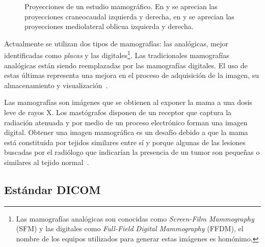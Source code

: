 \begin{figure}[h]
    \centering

    \hspace{1cm}

    \bigskip

    \hspace{1cm}

  \caption[Proyecciones de un estudio mamográfico]{Proyecciones de un estudio
  mamográfico. En \protect{} y \protect{} se aprecian las
  proyecciones craneocaudal izquierda y derecha, en \protect{} y
  \protect{} se aprecian las proyecciones mediolateral oblicua
  izquierda y derecha.}

  \label{fig:views}
\end{figure}

Actualmente se utilizan dos tipos de mamografías: las analógicas, mejor
identificadas como \textit{placas} y las digitales\footnote{Las mamografías
analógicas son conocidas como \textit{Screen-Film Mammography} (SFM) y las
digitales como \textit{Full-Field Digital Mammography} (FFDM), el nombre de los
equipos utilizados para generar estas imágenes es homónimo.}. Las tradicionales
mamografías analógicas están siendo reemplazadas por las mamografías digitales.
El uso de estas últimas representa una mejora en el proceso de adquisición de
la imagen, su almacenamiento y visualización~\cite{pisano2000current}.

Las mamografías son imágenes que se obtienen al exponer la mama a una dosis
leve de rayos X. Los mastógrafos disponen de un receptor que captura la
radiación atenuada y por medio de un proceso electrónico forman una imagen
digital. Obtener una imagen mamográfica es un desafío debido a que la mama está
constituida por tejidos similares entre sí y porque algunas de las lesiones
buscadas por el radiólogo que indicarían la presencia de un tumor son pequeñas
o similares al tejido normal~\cite{mxcancer}.

\subsection{Estándar DICOM}

